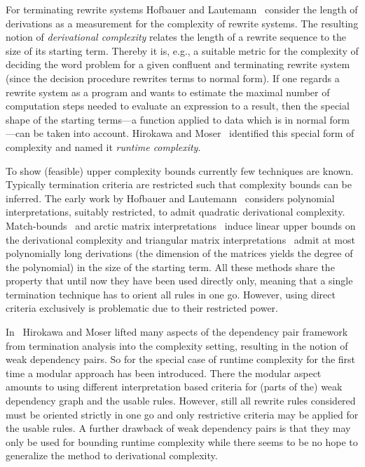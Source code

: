 \documentclass{LMCS}
\theoremstyle{plain}\newtheorem{mainthm}[thm]{Main Theorem}
\begin{document}
For terminating rewrite systems Hofbauer and Lautemann~\cite{HL89}
consider the length of derivations as a measurement for the complexity
of rewrite systems. The resulting notion of \emph{derivational complexity}
relates the length of a rewrite sequence to the size of its starting
term. Thereby it is, e.g., a suitable metric for the complexity of deciding
the word problem for a given confluent and terminating rewrite system
(since the decision procedure rewrites terms to normal form).
If one regards a rewrite system as a program and wants to estimate the
maximal number of computation steps needed to evaluate an expression to
a result, then the special shape of the starting terms---a function applied
to data which is in normal form---can be taken into account. Hirokawa and
Moser~\cite{HM08} identified this special form of complexity and named it
\emph{runtime complexity}.

To show (feasible) upper complexity bounds currently few techniques are
known. Typically termination criteria are restricted such that complexity
bounds can be inferred.
The early work by Hofbauer and Lautemann~\cite{HL89} considers polynomial
interpretations, suitably restricted, to admit quadratic derivational
complexity. Match-bounds~\cite{GHWZ07} and arctic matrix
interpretations~\cite{KW09} induce linear upper bounds on the
derivational complexity and triangular matrix interpretations~\cite{MSW08}
admit at most polynomially long derivations (the dimension of the matrices
yields the degree of the polynomial) in the size of the starting term.
All these methods share the property that until now they have been used
directly only, meaning that a single termination technique has to orient
all rules in one go. However, using direct criteria exclusively is
problematic due to their restricted power.

In~\cite{HM08,HM08b} Hirokawa and Moser lifted many aspects of the
dependency
pair framework from termination analysis into the complexity setting,
resulting in the notion of weak dependency pairs. So for the special
case of runtime complexity for the first time a modular approach
has been introduced. There the modular aspect amounts to using
different interpretation based criteria for (parts of the) weak dependency
graph and the
usable rules. However, still all rewrite rules considered must be oriented
strictly in one go and only restrictive criteria may be applied for the
usable rules. A further drawback of weak dependency pairs is that they
may only be used for bounding runtime complexity while there seems to be no
hope to generalize the method to derivational complexity.
\end{document}
